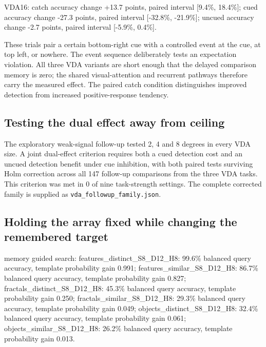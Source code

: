 \documentclass[11pt]{article}
\begin{document}
VDA16: catch accuracy change +13.7 points, paired interval [9.4\%, 18.4\%]; cued accuracy change -27.3 points, paired interval [-32.8\%, -21.9\%]; uncued accuracy change -2.7 points, paired interval [-5.9\%, 0.4\%].

These trials pair a certain bottom-right cue with a controlled event at the cue, at top left, or nowhere. The event sequence deliberately tests an expectation violation. All three VDA variants are short enough that the delayed comparison memory is zero; the shared visual-attention and recurrent pathways therefore carry the measured effect. The paired catch condition distinguishes improved detection from increased positive-response tendency.

\subsection{Testing the dual effect away from ceiling}
The exploratory weak-signal follow-up tested 2, 4 and 8 degrees in every VDA size. A joint dual-effect criterion requires both a cued detection cost and an uncued detection benefit under cue inhibition, with both paired tests surviving Holm correction across all 147 follow-up comparisons from the three VDA tasks. This criterion was met in 0 of nine task-strength settings. The complete corrected family is supplied as \texttt{vda\_followup\_family.json}.

\subsection{Holding the array fixed while changing the remembered target}
memory guided search: features\_\allowbreak{}distinct\_\allowbreak{}S8\_\allowbreak{}D12\_\allowbreak{}H8: 99.6\% balanced query accuracy, template probability gain 0.991; features\_\allowbreak{}similar\_\allowbreak{}S8\_\allowbreak{}D12\_\allowbreak{}H8: 86.7\% balanced query accuracy, template probability gain 0.827; fractals\_\allowbreak{}distinct\_\allowbreak{}S8\_\allowbreak{}D12\_\allowbreak{}H8: 45.3\% balanced query accuracy, template probability gain 0.250; fractals\_\allowbreak{}similar\_\allowbreak{}S8\_\allowbreak{}D12\_\allowbreak{}H8: 29.3\% balanced query accuracy, template probability gain 0.049; objects\_\allowbreak{}distinct\_\allowbreak{}S8\_\allowbreak{}D12\_\allowbreak{}H8: 32.4\% balanced query accuracy, template probability gain 0.061; objects\_\allowbreak{}similar\_\allowbreak{}S8\_\allowbreak{}D12\_\allowbreak{}H8: 26.2\% balanced query accuracy, template probability gain 0.013.
\end{document}
